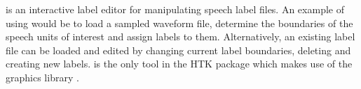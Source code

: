 %
%

\newpage
{}

\newcommand{\hbut}[1]{\texttt{#1}}
\newcommand{\hbbut}[1]{\fbox{\texttt{#1}}}


 is an interactive label editor for manipulating speech label files. 
An example of using  would be to load a sampled waveform file, 
determine the boundaries of the speech units of interest and assign labels 
to them. Alternatively, an existing label file can be loaded and edited by
changing current label boundaries, deleting and creating new labels.
 is the only tool in the HTK package which makes use of the 
graphics library .

